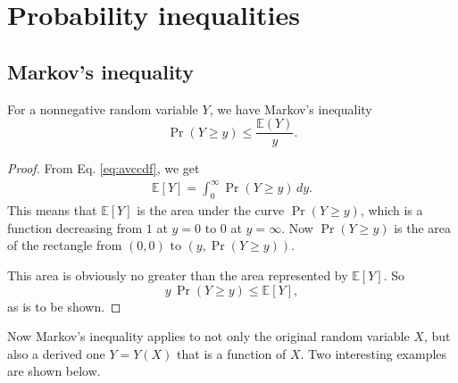 \documentclass{article}
\begin{document}
\section{Probability inequalities}

\subsection{Markov's inequality}

For a nonnegative random variable $Y$, we have Markov's inequality
\begin{equation}
\Pr(Y\ge y) \le \frac{ \mathbb{E}(Y) } { y }.
\label{eq:markov_eq}
\end{equation}

\begin{proof}
From Eq. \eqref{eq:avccdf}, we get
$$
\begin{aligned}
\mathbb{E}[Y] = \int_0^\infty \Pr(Y \ge y) \, dy.
\end{aligned}
$$
This means that $\mathbb{E}[Y]$ is the area under the curve $\Pr(Y\ge y)$,
which is a function decreasing from $1$ at $y = 0$ to $0$ at $y = \infty$.
%
Now $\Pr(Y\ge y)$ is the area of the rectangle from $(0, 0)$
to $(y, \Pr(Y\ge y))$.
%
\begin{figure}[h]
  \centering
\end{figure}
%
This area is obviously no greater than the area represented by $\mathbb{E}[Y]$.
So
%
$$
y \, \Pr(Y \ge y) \le \mathbb{E}[Y],
$$
as is to be shown.
\end{proof}

Now Markov's inequality applies to not only
the original random variable $X$, but also a derived one $Y = Y(X)$
that is a function of $X$.
Two interesting examples are shown below.
\end{document}
